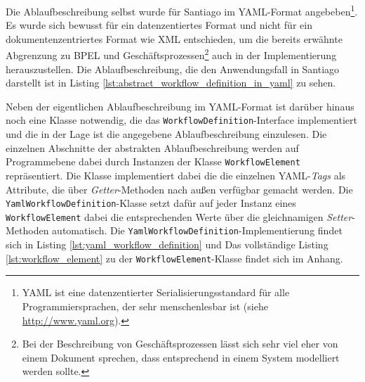 

  Die Ablaufbeschreibung selbst wurde für Santiago im YAML-Format angebeben\footnote{YAML ist eine datenzentierter Serialisierungsstandard für alle Programmiersprachen, der sehr menschenlesbar ist (siehe \url{http://www.yaml.org}).}. Es wurde sich bewusst für ein datenzentiertes Format und nicht für ein dokumentenzentriertes Format wie XML entschieden, um die bereits erwähnte Abgrenzung zu BPEL und Geschäftsprozessen\footnote{Bei der Beschreibung von Geschäftsprozessen lässt sich sehr viel eher von einem Dokument sprechen, dass entsprechend in einem System modelliert werden sollte.} auch in der Implementierung herauszustellen. Die Ablaufbeschreibung, die den Anwendungsfall in Santiago darstellt ist in Listing \ref{lst:abstract_workflow_definition_in_yaml} zu sehen.



  Neben der eigentlichen Ablaufbeschreibung im YAML-Format ist darüber hinaus noch eine Klasse notwendig, die das \verb!WorkflowDefinition!-Interface implementiert und die in der Lage ist die angegebene Ablaufbeschreibung einzulesen. Die einzelnen Abschnitte der abstrakten Ablaufbeschreibung werden auf Programmebene dabei durch Instanzen der Klasse \verb!WorkflowElement! repräsentiert. Die Klasse implementiert dabei die die einzelnen YAML-\emph{Tags} als Attribute, die über \emph{Getter}-Methoden nach außen verfügbar gemacht werden. Die \verb!YamlWorkflowDefinition!-Klasse setzt dafür auf jeder Instanz eines \verb!WorkflowElement! dabei die entsprechenden Werte über die gleichnamigen \emph{Setter}-Methoden automatisch. Die \verb!YamlWorkflowDefinition!-Implementierung findet sich in Listing \ref{lst:yaml_workflow_definition} und Das vollständige Listing \ref{lst:workflow_element} zu der \verb!WorkflowElement!-Klasse findet sich im Anhang.

  

